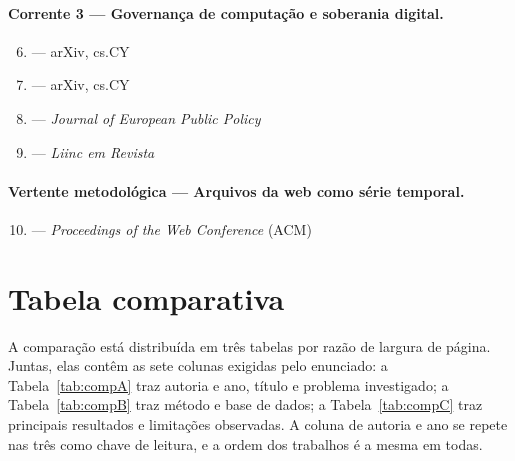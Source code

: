 \documentclass[12pt,a4paper]{article}
\begin{document}
\paragraph{Corrente 3 --- Governança de computação e soberania digital.}
\begin{enumerate}\setcounter{enumi}{5}
  \item \textcite{ahmed2020} --- arXiv, cs.CY
  \item \textcite{sastry2024} --- arXiv, cs.CY
  \item \textcite{mugge2024} --- \emph{Journal of European Public Policy}
  \item \textcite{furtado2024} --- \emph{Liinc em Revista}
\end{enumerate}

\paragraph{Vertente metodológica --- Arquivos da web como série temporal.}
\begin{enumerate}\setcounter{enumi}{9}
  \item \textcite{amos2021} --- \emph{Proceedings of the Web Conference} (ACM)
\end{enumerate}

\clearpage
\section{Tabela comparativa}

A comparação está distribuída em três tabelas por razão de largura de página. Juntas,
elas contêm as sete colunas exigidas pelo enunciado: a Tabela~\ref{tab:compA} traz
autoria e ano, título e problema investigado; a Tabela~\ref{tab:compB} traz método e
base de dados; a Tabela~\ref{tab:compC} traz principais resultados e limitações
observadas. A coluna de autoria e ano se repete nas três como chave de leitura, e a
ordem dos trabalhos é a mesma em todas.
\end{document}
